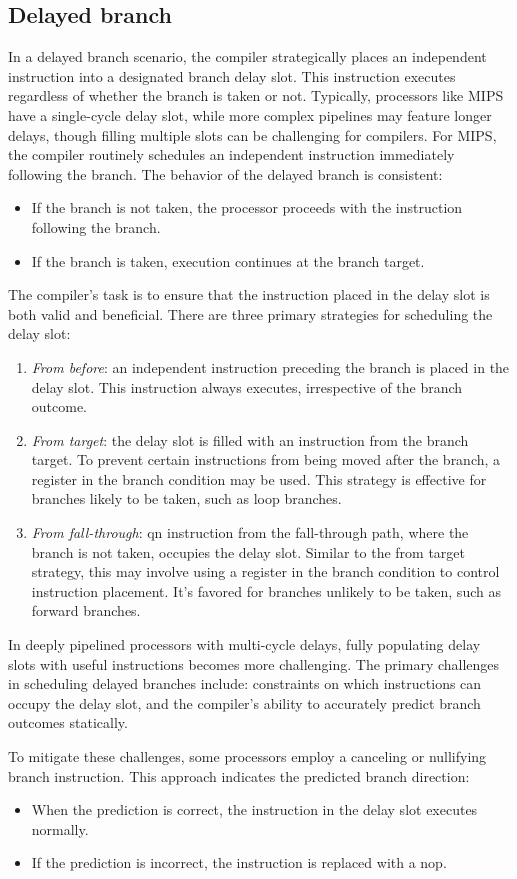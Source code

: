 \subsection{Delayed branch}
In a delayed branch scenario, the compiler strategically places an independent instruction into a designated branch delay slot.
This instruction executes regardless of whether the branch is taken or not.
Typically, processors like MIPS have a single-cycle delay slot, while more complex pipelines may feature longer delays, though filling multiple slots can be challenging for compilers.
For MIPS, the compiler routinely schedules an independent instruction immediately following the branch. 
The behavior of the delayed branch is consistent:
\begin{itemize}
    \item If the branch is not taken, the processor proceeds with the instruction following the branch.
    \item If the branch is taken, execution continues at the branch target.
\end{itemize}
The compiler's task is to ensure that the instruction placed in the delay slot is both valid and beneficial. 
There are three primary strategies for scheduling the delay slot:

\begin{enumerate}
    \item \textit{From before}: an independent instruction preceding the branch is placed in the delay slot.
        This instruction always executes, irrespective of the branch outcome.
    \item \textit{From target}: the delay slot is filled with an instruction from the branch target. 
        To prevent certain instructions from being moved after the branch, a register in the branch condition may be used. 
        This strategy is effective for branches likely to be taken, such as loop branches.
    \item \textit{From fall-through}: qn instruction from the fall-through path, where the branch is not taken, occupies the delay slot. 
        Similar to the from target strategy, this may involve using a register in the branch condition to control instruction placement. 
        It's favored for branches unlikely to be taken, such as forward branches.
\end{enumerate}
In deeply pipelined processors with multi-cycle delays, fully populating delay slots with useful instructions becomes more challenging.
The primary challenges in scheduling delayed branches include: constraints on which instructions can occupy the delay slot, and the compiler's ability to accurately predict branch outcomes statically. 

To mitigate these challenges, some processors employ a canceling or nullifying branch instruction. 
This approach indicates the predicted branch direction:
\begin{itemize}
    \item When the prediction is correct, the instruction in the delay slot executes normally.
    \item If the prediction is incorrect, the instruction is replaced with a nop.
\end{itemize}